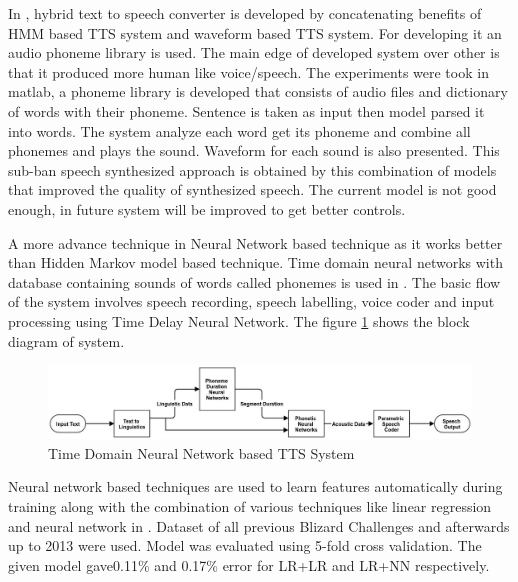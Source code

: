 In \cite{ganai2016text}, hybrid text to speech converter is developed by
concatenating benefits of HMM based TTS system and waveform based TTS system. For developing it an audio phoneme library is used. The main
edge of developed system over other is that it produced more human like voice/speech. The experiments were took in
matlab, a phoneme library is developed that consists of audio files and dictionary of words with their phoneme. Sentence is
taken as input then model parsed it into words. The system analyze each word get its phoneme and combine all phonemes
and plays the sound. Waveform for each sound is also presented. This sub-ban speech synthesized approach is obtained by
this combination of models that improved the quality of synthesized speech. The current model is not good enough, in future
system will be improved to get better controls.


A more advance technique in Neural Network based technique as it works better than Hidden
Markov model based technique. Time domain neural networks with
database containing sounds of words called phonemes is used in \cite{karaali1998text}. The basic flow of the system involves
speech recording, speech labelling, voice coder and input processing using Time Delay Neural
Network. The figure \ref{fig:Time Domain Neural Network based TTS System} shows the block diagram of system.

\begin{center}
	\begin{figure}[hbtp]
		\centering
		\includegraphics[width=\linewidth]{images/time_domain_neural_network.jpg}
		\caption{Time Domain Neural Network based TTS System}
		\label{fig:Time Domain Neural Network based TTS System}
	\end{figure}
		
\end{center}

Neural network based techniques are used to learn features automatically during training along with the combination of various techniques 
like linear regression and neural network in \cite{yoshimura2016hierarchical}. Dataset of all previous Blizard Challenges \cite{blizzard_2009_corpus} and
afterwards up to 2013 were used. Model was evaluated using 5-fold cross validation. The given model gave0.11\% and 0.17\% error for LR+LR and LR+NN 
respectively.


